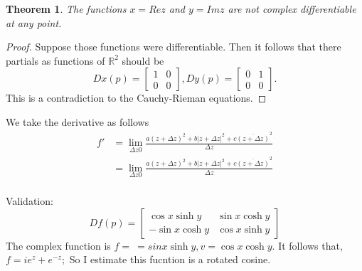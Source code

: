 \documentclass[letter]{article}
\newtheorem{theorem}{Theorem}
\newenvironment{menumerate}{%
  \edef\backupindent{\the\parindent}%
  \enumerate%
  \setlength{\parindent}{\backupindent}%
}{\endenumerate}
\begin{document}
\begin{menumerate}
 	\item 
 	\begin{theorem}
 		The functions $x= Re z$ and $y = Im z$ are not complex differentiable
 		at any point.
 	\end{theorem}
 	\begin{proof}
 		Suppose those functions were differentiable. Then it follows that
 		there partials as functions of $\mathbb{R}^2$ should be 
 		\begin{equation}
 			Dx(p) = \begin{bmatrix}
 				1 & 0 \\
 				0 & 0
 			\end{bmatrix},
 			Dy(p) = \begin{bmatrix}
 				0 & 1 \\
 				0 & 0
 			\end{bmatrix}.
 		\end{equation}
 		This is a contradiction to the Cauchy-Rieman equations.
 	\end{proof}
 	\item We take the derivative as follows
 	\begin{equation}
 		\begin{aligned}
 			f' &= \lim_{\Delta z 0} \frac{a(z + \Delta z)^2 + b|z+ \Delta z|^2 + c \overline{(z + \Delta z)}^2}{\Delta z} \\
 			&= \lim_{\Delta z 0} \frac{a(z + \Delta z)^2 + b|z+ \Delta z|^2 + c \overline{(z + \Delta z)}^2}{\Delta z} \\
 		\end{aligned}
 	\end{equation}
 	\item Validation:
 	\begin{equation}
 		Df(p) = \begin{bmatrix}
 			\cos x \sinh y & \sin x \cosh y \\
 			-\sin x \cosh y & \cos x \sinh y
 		\end{bmatrix}
 	\end{equation}
 	The complex function is $f = \ = sin x \sinh y, v = \cos x \cosh y$. It follows that, $f = ie^z +e^{-z};$ So I estimate this fucntion is a rotated cosine.
 	
\end{menumerate}
\end{document}
